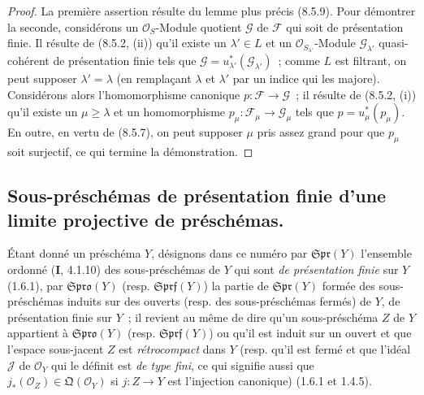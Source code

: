 \begin{proof}
La première assertion résulte du lemme plus précis (8.5.9). Pour démontrer la
seconde, considérons un $\mathcal O_S$-Module quotient $\mathcal G$ de
$\mathcal F$ qui soit de présentation finie. Il résulte de (8.5.2, (ii)) qu'il
existe un $\lambda'\in L$ et un $\mathcal O_{S_{\lambda'}}$-Module
$\mathcal G_{\lambda'}$ quasi-cohérent de présentation finie tels que
$\mathcal G=u_{\lambda'}^*(\mathcal G_{\lambda'})$~; comme $L$ est filtrant, on
peut supposer $\lambda'=\lambda$ (en remplaçant $\lambda$ et $\lambda'$ par un
indice qui les majore). Considérons alors l'homomorphisme canonique
$p:\mathcal F\to\mathcal G$~; il résulte de (8.5.2, (i)) qu'il existe un
$\mu\geq\lambda$ et un homomorphisme
$p_\mu:\mathcal F_\mu\to\mathcal G_\mu$ tels que $p=u_\mu^*(p_\mu)$. En outre,
en vertu de (8.5.7), on peut supposer $\mu$ pris assez grand pour que $p_\mu$
soit surjectif, ce qui termine la démonstration.
\end{proof}

\subsection{Sous-préschémas de présentation finie d'une limite projective de préschémas.}
\label{subsection:IV.8.6-fr}

\begin{env}[8.6.1]
\label{IV.8.6.1-fr}
Étant donné un préschéma $Y$, désignons dans ce numéro par
$\mathfrak{Spr}(Y)$ l'ensemble ordonné (\textbf{I}, 4.1.10) des sous-préschémas de $Y$
qui sont \emph{de présentation finie} sur $Y$ (1.6.1), par $\mathfrak{Spro}(Y)$
(resp. $\mathfrak{Sprf}(Y)$) la partie de $\mathfrak{Spr}(Y)$ formée des
sous-préschémas induits sur des ouverts (resp. des sous-préschémas fermés) de
$Y$, de présentation finie sur $Y$~; il revient au même de dire qu'un
sous-préschéma $Z$ de $Y$ appartient à $\mathfrak{Spro}(Y)$ (resp.
$\mathfrak{Sprf}(Y)$) ou qu'il est induit sur un ouvert et que l'espace
sous-jacent $Z$ est \emph{rétrocompact} dans $Y$ (resp. qu'il est fermé et que l'idéal
$\mathcal J$ de $\mathcal O_Y$ qui le définit est \emph{de type fini}, ce qui signifie
aussi que $j_*(\mathcal O_Z)\in\mathfrak Q(\mathcal O_Y)$ si $j:Z\to Y$ est
l'injection canonique) (1.6.1 et 1.4.5).
\end{env}


